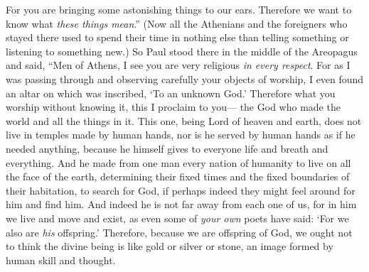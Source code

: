 \begin{biblechapter}
\verse For you are bringing some astonishing things to our ears. Therefore we want to know what \textit{these things mean}.”
\verse (Now all the Athenians and the foreigners who stayed there used to spend their time in nothing else than telling something or listening to something new.)
 So Paul stood there in the middle of the Areopagus and said, “Men of Athens, I see you are very religious \textit{in every respect}.
\verse For as I was passing through and observing carefully your objects of worship, I even found an altar on which was inscribed, ‘To an unknown God.’ Therefore what you worship without knowing it, this I proclaim to you—
\verse the God who made the world and all the things in it. This one, being Lord of heaven and earth, does not live in temples made by human hands,
\verse nor is he served by human hands as if he needed anything, because he himself gives to everyone life and breath and everything.
\verse And he made from one man every nation of humanity to live on all the face of the earth, determining their fixed times and the fixed boundaries of their habitation,
\verse to search for God, if perhaps indeed they might feel around for him and find him. And indeed he is not far away from each one of us,
\verse for in him we live and move and exist, as even some of \textit{your own} poets have said: ‘For we also are \textit{his} offspring.’
\verse Therefore, because we are offspring of God, we ought not to think the divine being is like gold or silver or stone, an image formed by human skill and thought.

\end{biblechapter}
